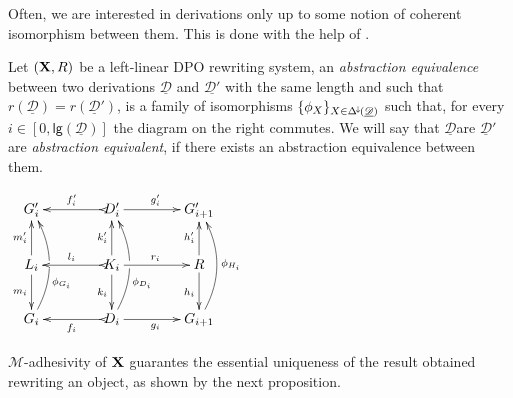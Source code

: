 \documentclass[a4paper,UKenglish,cleveref,pdftex, thm-restate,numberwithinsect]{lipics}
\newcommand{\Deltamin}{\Delta^{\hspace{-1pt}\downarrow\hspace{-1pt}}}
\def\R{\mathsf{R}}
\def\X{\textbf {\textup{X}}}
\newcommand{\dder}[1]{\mathscr{#1}}
\newcommand{\der}[1]{\underline{\dder{#1}}}
\newcommand{\lgh}[0]{\mathsf{lg}}
\begin{document}
Often, we are interested in derivations only up to some notion of coherent isomorphism between them. This is done with the help of .

\noindent 
\parbox{8cm}{
\begin{definition}Let $(\X, \R)$ be a left-linear DPO rewriting system,  an \emph{abstraction equivalence} between two derivations $\der{D}$ and $\der{D'}$ with the same length and such that $r(\der{D})=r(\der{D}')$, is a family of isomorphisms $\{\phi_X\}_{X\in \Deltamin(\der{D})}$ such that, for every $i\in [0, \lgh(\der{D})]$ the diagram on the right commutes. We will say that  $\der{D}$are $\der{D}'$  are \emph{abstraction equivalent}, if there exists an abstraction equivalence between them.
\end{definition}}
\parbox{4cm}{\vspace{-1.35em}$\xymatrix@C=40pt{G'_i&D'_i \ar[r]^{g'_i} \ar@{>->}[l]_{f'_i}&G'_{i+1}\\  L_i \ar[u]^{m'_i} \ar[d]_{m_i}& K_i \ar[u]^{k'_i} \ar[d]_{k_i} \ar[r]^{r_i} \ar@{>->}[l]_{l_i} &R\ar[u]^{h'_i} \ar[d]_{h_i}\\G_i \ar@/_.45cm/[uu]_(.35){\phi_{G_i}}|\hole&D_i\ar@{>->}[l]^{f_i}\ar@/_.45cm/[uu]_(.35){\phi_{D_i}}|\hole \ar[r]_{g_i}&G_{i+1}\ar@/_.45cm/[uu]_{\phi_{H_i}}}$}



$\mathcal{M}$-adhesivity of $\X$ guarantes the essential uniqueness of the result obtained rewriting an object, as shown by the next proposition.
\end{document}
